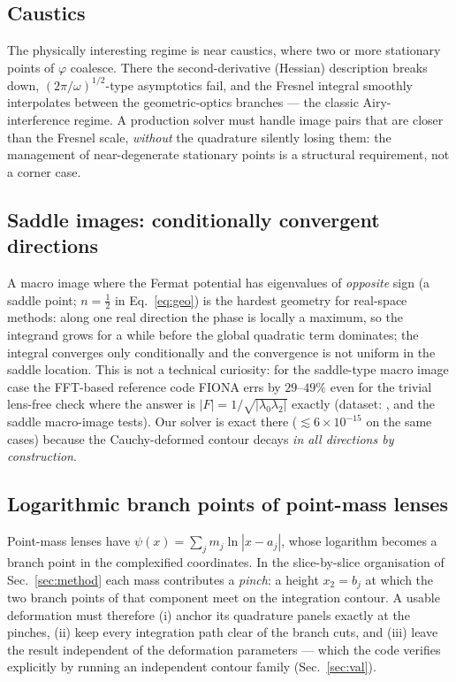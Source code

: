\documentclass[11pt,a4paper]{article}
\newcommand{\Fresnel}{F}
\begin{document}
\subsection{Caustics}
\label{sec:caustics}

The physically interesting regime is near caustics, where two or more
stationary points of $\varphi$ coalesce.  There the second-derivative
(Hessian) description breaks down, $(2\pi/\omega)^{1/2}$-type asymptotics
fail, and the Fresnel integral smoothly interpolates between the
geometric-optics branches --- the classic Airy-interference regime.  A
production solver must handle image pairs that are closer than the Fresnel
scale, {\it without} the quadrature silently losing them: the management of
near-degenerate stationary points is a structural requirement, not a corner
case.

\subsection{Saddle images: conditionally convergent directions}
\label{sec:saddle}

A macro image where the Fermat potential has eigenvalues of \emph{opposite}
sign (a saddle point; $n = \tfrac12$ in Eq.~\eqref{eq:geo}) is the hardest
geometry for real-space methods: along one real direction the phase is
locally a maximum, so the integrand grows for a while before the global
quadratic term dominates; the integral converges only conditionally and the
convergence is not uniform in the saddle location.  This is not a technical
curiosity: for the saddle-type macro image case the FFT-based reference code
FIONA errs by $29$--$49\%$ even for the trivial lens-free check where the
answer is $|\Fresnel| = 1/\sqrt{|\lambda_0\lambda_2|}$ exactly (dataset:
, and the saddle macro-image
tests).  Our solver is exact there ($\lesssim 6\times10^{-15}$ on the same
cases) because the Cauchy-deformed contour decays \emph{in all directions by
construction}.

\subsection{Logarithmic branch points of point-mass lenses}
\label{sec:branches}

Point-mass lenses have $\psi(x) = \sum_j m_j \ln|x-a_j|$, whose logarithm
becomes a branch point in the complexified coordinates.  In the
slice-by-slice organisation of Sec.~\ref{sec:method} each mass contributes a
\emph{pinch}: a height $x_2 = b_j$ at which the two branch points of that
component meet on the integration contour.  A usable deformation must
therefore (i) anchor its quadrature panels exactly at the pinches, (ii) keep
every integration path clear of the branch cuts, and (iii) leave the result
independent of the deformation parameters --- which the code verifies
explicitly by running an independent contour family (Sec.~\ref{sec:val}).
\end{document}

